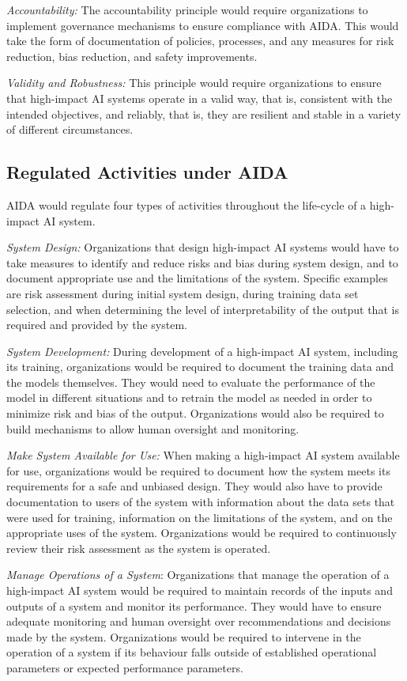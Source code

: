 \emph{Accountability:} The accountability principle would require organizations to implement governance mechanisms to ensure compliance with AIDA. This would take the form of documentation of policies, processes, and any measures for risk reduction, bias reduction, and safety improvements. 

\emph{Validity and Robustness:} This principle would require organizations to ensure that high-impact AI systems operate in a valid way, that is, consistent with the intended objectives, and reliably, that is, they are resilient and stable in a variety of different circumstances. 

\subsection*{Regulated Activities under AIDA}

AIDA would regulate four types of activities throughout the life-cycle of a high-impact AI system.

\emph{System Design:} Organizations that design high-impact AI systems would have to take measures to identify and reduce risks and bias during system design, and to document appropriate use and the limitations of the system. Specific examples are risk assessment during initial system design, during training data set selection, and when determining the level of interpretability of the output that is required and provided by the system.

\emph{System Development:} During development of a high-impact AI system, including its training, organizations would be required to document the training data and the models themselves. They would need to evaluate the performance of the model in different situations and to retrain the model as needed in order to minimize risk and bias of the output. Organizations would also be required to build mechanisms to allow human oversight and monitoring.

\emph{Make System Available for Use:} When making a high-impact AI system available for use, organizations would be required to document how the system meets its requirements for a safe and unbiased design. They would also have to provide documentation to users of the system with information about the data sets that were used for training, information on the limitations of the system, and on the appropriate uses of the system. Organizations would be required to continuously review their risk assessment as the system is operated.

\emph{Manage Operations of a System}: Organizations that manage the operation of a high-impact AI system would be required to maintain records of the inputs and outputs of a system and monitor its performance. They would have to ensure adequate monitoring and human oversight over recommendations and decisions made by the system. Organizations would be required to intervene in the operation of a system if its behaviour falls outside of established operational parameters or expected performance parameters. 

